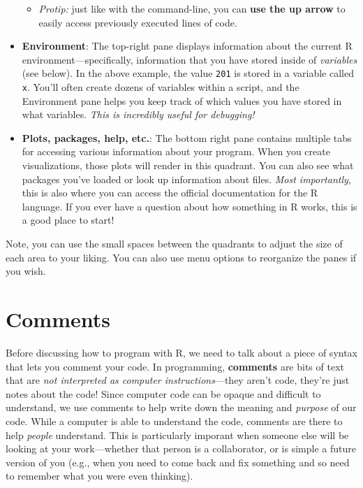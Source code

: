 \documentclass[]{book}
\providecommand{\tightlist}{%
  \setlength{\itemsep}{0pt}\setlength{\parskip}{0pt}}
\theoremstyle{definition}
\theoremstyle{definition}
\theoremstyle{remark}
\begin{document}
\begin{itemize}
  \begin{itemize}
  \tightlist
  \item
    \emph{Protip:} just like with the command-line, you can \textbf{use
    the up arrow} to easily access previously executed lines of code.
  \end{itemize}
\item
  \textbf{Environment}: The top-right pane displays information about
  the current R environment---specifically, information that you have
  stored inside of \emph{variables} (see below). In the above example,
  the value \texttt{201} is stored in a variable called \texttt{x}.
  You'll often create dozens of variables within a script, and the
  Environment pane helps you keep track of which values you have stored
  in what variables. \emph{This is incredibly useful for debugging!}
\item
  \textbf{Plots, packages, help, etc.}: The bottom right pane contains
  multiple tabs for accessing various information about your program.
  When you create visualizations, those plots will render in this
  quadrant. You can also see what packages you've loaded or look up
  information about files. \emph{Most importantly}, this is also where
  you can access the official documentation for the R language. If you
  ever have a question about how something in R works, this is a good
  place to start!
\end{itemize}

Note, you can use the small spaces between the quadrants to adjust the
size of each area to your liking. You can also use menu options to
reorganize the panes if you wish.

\section{Comments}\label{comments}

Before discussing how to program with R, we need to talk about a piece
of syntax that lets you comment your code. In programming,
\textbf{comments} are bits of text that are \emph{not interpreted as
computer instructions}---they aren't code, they're just notes about the
code! Since computer code can be opaque and difficult to understand, we
use comments to help write down the meaning and \emph{purpose} of our
code. While a computer is able to understand the code, comments are
there to help \emph{people} understand. This is particularly imporant
when someone else will be looking at your work---whether that person is
a collaborator, or is simple a future version of you (e.g., when you
need to come back and fix something and so need to remember what you
were even thinking).
\end{document}
